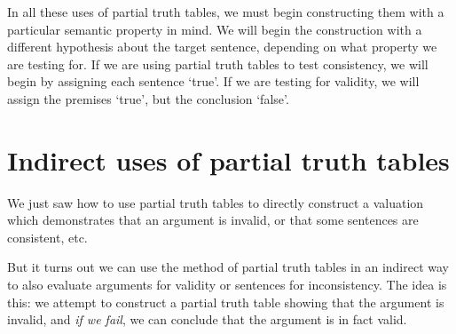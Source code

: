 In all these uses of partial truth tables, we must begin constructing them with a particular semantic property in mind. We will begin the construction with a different hypothesis about the target sentence, depending on what property we are testing for. If we are using partial truth tables to test consistency, we will begin by assigning each sentence `true'. If we are testing for validity, we will assign the premises `true', but the conclusion `false'.


\section{Indirect uses of partial truth tables}

We just saw how to use partial truth tables to directly construct a valuation which demonstrates that an argument is invalid, or that some sentences are consistent, etc.

But it turns out we can use the method of partial truth tables in an indirect way to also evaluate arguments for validity or sentences for inconsistency. The idea is this: we attempt to construct a partial truth table showing that the argument is invalid, and \emph{if we fail}, we can conclude that the argument is in fact valid.

